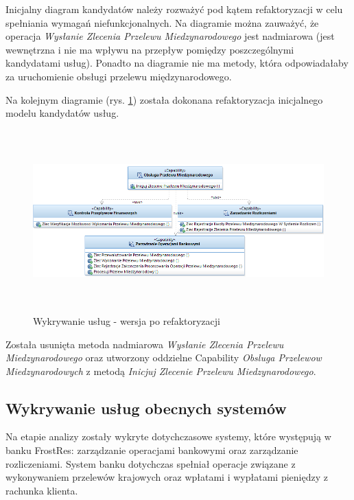 Inicjalny diagram kandydatów należy rozważyć pod kątem refaktoryzacji w celu spełniania wymagań niefunkcjonalnych. Na diagramie można zauważyć, że operacja \emph{Wysłanie Zlecenia Przelewu Miedzynarodowego} jest nadmiarowa (jest wewnętrzna i nie ma wpływu na przepływ pomiędzy poszczególnymi kandydatami usług). Ponadto na diagramie nie ma metody, która odpowiadałaby za uruchomienie obsługi przelewu międzynarodowego. 

Na kolejnym diagramie (rys. \ref{service_candidates_refactored}) została dokonana refaktoryzacja inicjalnego modelu kandydatów usług. 

\begin{figure}[h!tbp]
\begin{centering}
\includegraphics[width=16cm, height=7cm]{img/service_candidates_refactored.png}
\caption[Wykrywanie usług - wersja po refaktoryzacji]{Wykrywanie usług - wersja po refaktoryzacji}\label{service_candidates_refactored}
\end{centering}
\end{figure}

Została usunięta metoda nadmiarowa \emph{Wysłanie Zlecenia Przelewu Miedzynarodowego} oraz utworzony oddzielne Capability \emph{Obsluga Przelewow Miedzynarodowych} z metodą \emph{Inicjuj Zlecenie Przelewu Miedzynarodowego}.

\subsection{Wykrywanie usług obecnych systemów}
Na etapie analizy zostały wykryte dotychczasowe systemy, które występują w banku FrostRes: zarządzanie operacjami bankowymi oraz zarządzanie rozliczeniami. System banku dotychczas spełniał operacje związane z wykonywaniem przelewów krajowych oraz wpłatami i wypłatami pieniędzy z rachunka klienta. 

